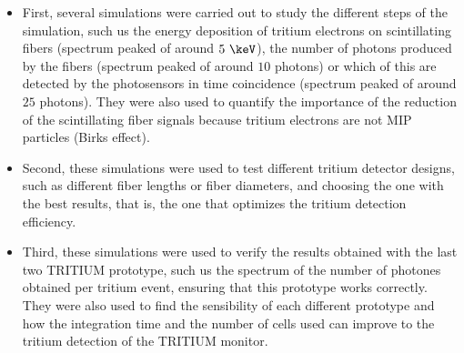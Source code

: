 \begin{itemize}

\item{} First, several simulations were carried out to study the different steps of the simulation, such us the energy deposition of tritium electrons on scintillating fibers (spectrum peaked of around $5~\keV$), the number of photons produced by the fibers (spectrum peaked of around $10$ photons) or which of this are detected by the photosensors in time coincidence (spectrum peaked of around $25$ photons). They were also used to quantify the importance of the reduction of the scintillating fiber signals because tritium electrons are not MIP particles (Birks effect).

\item{} Second, these simulations were used to test different tritium detector designs, such as different fiber lengths or fiber diameters, and choosing the one with the best results, that is, the one that optimizes the tritium detection efficiency.

\item{} Third, these simulations were used to verify the results obtained with the last two TRITIUM prototype, such us the spectrum of the number of photones obtained per tritium event, ensuring that this prototype works correctly. They were also used to find the sensibility of each different prototype and how the integration time and the number of cells used can improve to the tritium detection of the TRITIUM monitor.

\end{itemize}

